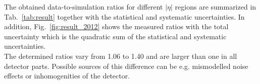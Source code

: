 The obtained data-to-simulation ratios for different $|\eta|$ regions are summarized in Tab.~\ref{tab:result} together with the statistical and systematic uncertainties. In addition, Fig.~\ref{fig:result_2012} shows the measured ratios with the total uncertainty which is the quadratic sum of the statistical and systematic uncertainties. \\
The determined ratios vary from 1.06 to 1.40 and are larger than one in all detector parts. Possible sources of this difference can be e.g. mismodelled noise effects or inhomogenities of the detector.

\begin{table}[!hp]
\centering
\caption{Measured data-to-simulation ratio in various $|\eta|$ regions with statistical and systematic uncertainty as well as the total uncertainty.}
\label{tab:result}
\end{table} 

